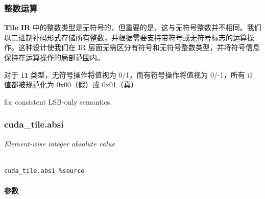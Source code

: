 \documentclass{article}
\begin{document}
\subsubsection{整数运算}


\textbf{Tile IR} 中的整数类型是无符号的，但重要的是，这与无符号整数并不相同。我们以二进制补码形式存储所有整数，并根据需要支持带符号或无符号标志的运算操作。这种设计使我们在 IR 层面无需区分有符号和无符号整数类型，并将符号信息保持在运算操作的局部范围内。



对于 \texttt{i1} 类型，无符号操作将值视为 0/1，而有符号操作将值视为 0/-1，所有 i1 值都被规范化为 0x00（假）或 0x01（真）

for consistent LSB-only semantics.






\subsubsection{cuda\_tile.absi}


\textit{Element-wise integer absolute value}




\begin{lstlisting}

cuda_tile.absi %source

\end{lstlisting}



\paragraph{参数}
\end{document}
